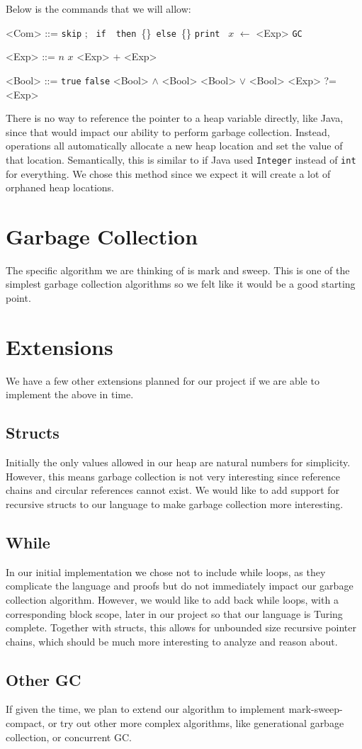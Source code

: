 \documentclass{article}
\newcommand{\comskip}{\texttt{skip}\xspace}
\newcommand{\comgc}{\texttt{GC}\xspace}
\newcommand{\comif}[3]{\texttt{if}\ #1\  \texttt{then}\ \{#2\}\ \texttt{else}\ \{#3\}\xspace}
\newcommand{\comprint}[1]{\texttt{print}\ #1\xspace}
\newcommand{\comseq}[2]{#1;\ #1\xspace}
\newcommand{\booltrue}{\texttt{true}}
\newcommand{\boolfalse}{\texttt{false}}
\begin{document}
Below is the commands that we will allow:
\begin{grammar}
<Com> ::= \comskip
\alt \comseq{}{}
\alt \comif{}{\synt{Com}}{\synt{Com}}
\alt \comprint{}
\alt $x$ $\leftarrow$ <Exp>
\alt \comgc

<Exp> ::= $n$
\alt $x$
\alt <Exp> + <Exp>

<Bool> ::= \booltrue
\alt \boolfalse
\alt <Bool> $\land$ <Bool>
\alt <Bool> $\lor$ <Bool>
\alt <Exp> ?= <Exp>
\end{grammar}

There is no way to reference the pointer to a heap variable directly, like Java, since that would impact our ability to perform garbage collection. Instead, operations all automatically allocate a new heap location and set the value of that location. Semantically, this is similar to if Java used \texttt{Integer} instead of \texttt{int} for everything. We chose this method since we expect it will create a lot of orphaned heap locations. 

\section{Garbage Collection}
The specific algorithm we are thinking of is mark and sweep. This is one of the simplest garbage collection algorithms so we felt like it would be a good starting point.

\section{Extensions}
We have a few other extensions planned for our project if we are able to implement the above in time.

\subsection{Structs}
Initially the only values allowed in our heap are natural numbers for simplicity. However, this means garbage collection is not very interesting since reference chains and circular references cannot exist. We would like to add support for recursive structs to our language to make garbage collection more interesting.

\subsection{While}
In our initial implementation we chose not to include while loops, as they complicate the language and proofs but do not immediately impact our garbage collection algorithm. However, we would like to add back while loops, with a corresponding block scope, later in our project so that our language is Turing complete. Together with structs, this allows for unbounded size recursive pointer chains, which should be much more interesting to analyze and reason about.

\subsection{Other GC}
If given the time, we plan to extend our algorithm to implement mark-sweep-compact, or try out other more complex algorithms, like generational garbage collection, or concurrent GC.
\end{document}

